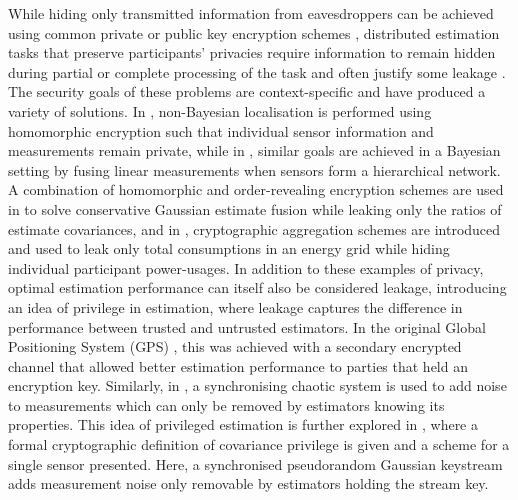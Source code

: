 \documentclass[letterpaper, 10 pt, conference]{ieeeconf}
\begin{document}
While hiding only transmitted information from eavesdroppers can be achieved using common private or public key encryption schemes \cite{katzIntroductionModernCryptography2008}, distributed estimation tasks that preserve participants' privacies require information to remain hidden during partial or complete processing of the task and often justify some leakage \cite{risticSecureFastCovariance2021,shiPrivacyPreservingAggregationTimeSeries2011}. The security goals of these problems are context-specific and have produced a variety of solutions. In \cite{alanwarPrOLocResilientLocalization2017}, non-Bayesian localisation is performed using homomorphic encryption such that individual sensor information and measurements remain private, while in \cite{aristovEncryptedMultisensorInformation2018}, similar goals are achieved in a Bayesian setting by fusing linear measurements when sensors form a hierarchical network. A combination of homomorphic and order-revealing encryption schemes are used in \cite{risticSecureFastCovariance2021} to solve conservative Gaussian estimate fusion while leaking only the ratios of estimate covariances, and in \cite{shiPrivacyPreservingAggregationTimeSeries2011,joyeScalableSchemePrivacyPreserving2013}, cryptographic aggregation schemes are introduced and used to leak only total consumptions in an energy grid while hiding individual participant power-usages. In addition to these examples of privacy, optimal estimation performance can itself also be considered leakage, introducing an idea of privilege in estimation, where leakage captures the difference in performance between trusted and untrusted estimators. In the original Global Positioning System (GPS) \cite{grovesPrinciplesGNSSInertial2015}, this was achieved with a secondary encrypted channel that allowed better estimation performance to parties that held an encryption key. Similarly, in \cite{murguiaInformationTheoreticPrivacyChaos2020}, a synchronising chaotic system is used to add noise to measurements which can only be removed by estimators knowing its properties. This idea of privileged estimation is further explored in \cite{risticCryptographicallyPrivilegedState2022}, where a formal cryptographic definition of covariance privilege is given and a scheme for a single sensor presented. Here, a synchronised pseudorandom Gaussian keystream adds measurement noise only removable by estimators holding the stream key.
\end{document}
